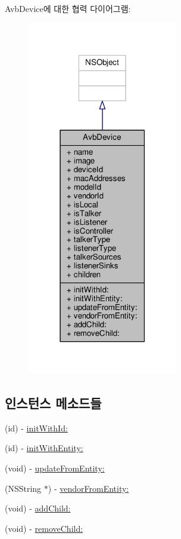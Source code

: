 Avb\+Device에 대한 협력 다이어그램\+:
\nopagebreak
\begin{figure}[H]
\begin{center}
\leavevmode
\includegraphics[width=186pt]{interface_avb_device__coll__graph}
\end{center}
\end{figure}
\subsection*{인스턴스 메소드들}
\begin{DoxyCompactItemize}
\item 
(id) -\/ \hyperlink{interface_avb_device_a7de755b292a64334b3e910910e713d84}{init\+With\+Id\+:}
\item 
(id) -\/ \hyperlink{interface_avb_device_a2754055fc1d5640ce20afd0e8912f8f8}{init\+With\+Entity\+:}
\item 
(void) -\/ \hyperlink{interface_avb_device_a67af5abda121664dd9a4d007a1054884}{update\+From\+Entity\+:}
\item 
(N\+S\+String $\ast$) -\/ \hyperlink{interface_avb_device_a2e2d550fa19e94c61be8e94ae528bc46}{vendor\+From\+Entity\+:}
\item 
(void) -\/ \hyperlink{interface_avb_device_a464150c901a3d824a1f198c4c4c8bda9}{add\+Child\+:}
\item 
(void) -\/ \hyperlink{interface_avb_device_ad67d0da5f3819830407dc2c38eaefaf1}{remove\+Child\+:}
\end{DoxyCompactItemize}
